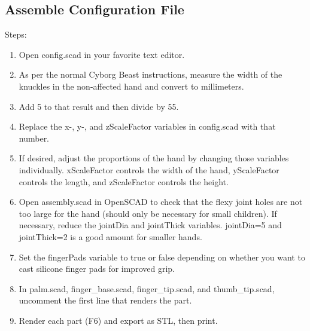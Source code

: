 \documentclass[11pt]{article}
\begin{document}
\subsection{Assemble Configuration File}Steps:
\begin{enumerate}
\item Open config.scad in your favorite text editor.
\item As per the normal Cyborg Beast instructions, measure the width of the knuckles in the non-affected hand and convert to millimeters.
\item Add 5 to that result and then divide by 55.
\item Replace the x-, y-, and zScaleFactor variables in config.scad with that number.
\item If desired, adjust the proportions of the hand by changing those variables individually. xScaleFactor controls the width of the hand, yScaleFactor controls the length, and zScaleFactor controls the height.
\item Open assembly.scad in OpenSCAD to check that the flexy joint holes are not too large for the hand (should only be necessary for small children). If necessary, reduce the jointDia and jointThick variables. jointDia=5 and jointThick=2 is a good amount for smaller hands.
\item Set the fingerPads variable to true or false depending on whether you want to cast silicone finger pads for improved grip.
\item In palm.scad, finger\_base.scad, finger\_tip.scad, and thumb\_tip.scad, uncomment the first line that renders the part.
\item Render each part (F6) and export as STL, then print.
\end{enumerate}
\end{document}
